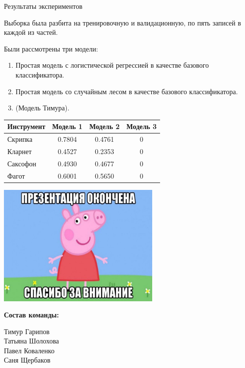 \documentclass[unicode, dvipsnames]{beamer}
\begin{document}
\begin{frame}{Результаты экспериментов}

Выборка была разбита на тренировочную и валидационную, по пять записей в каждой из частей.

\bigskip
Были рассмотрены три модели: 
\begin{enumerate}
	\item Простая модель с логистической регрессией в качестве базового классификатора.
	\item Простая модель со случайным лесом в качестве базового классификатора.
	\item (Модель Тимура).
\end{enumerate}

\bigskip
\centering
\begin{tabular}{|l|c|c|c|}
	\hline
	Инструмент & Модель 1 & Модель 2 & Модель 3 \\
	\hline
	Скрипка & 0.7804 & 0.4761 & 0 \\
	\hline
	Кларнет & 0.4527 & 0.2353 & 0 \\
	\hline
	Саксофон & 0.4930 & 0.4677 & 0 \\
	\hline
	Фагот & 0.6001 & 0.5650 & 0 \\
	\hline
\end{tabular}

\end{frame}

\begin{frame}{}

\centering
\includegraphics[width=0.6\textwidth]{graphics/final.jpg}

\bigskip
\textbf{Состав команды:}

Тимур Гарипов \\ Татьяна Шолохова \\ Павел Коваленко \\ Саня Щербаков

\end{frame}
\end{document}
